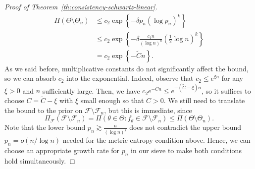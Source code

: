 \begin{proof}[Proof of Theorem~\ref{th:consistency-schwartz-linear}]
\begin{align*}
  \Pi(\Theta \setminus \Theta_n) & \leq c_2 \exp\left\{-\delta p_n (\log p_n)^k\right\}                                                    \\
                                 & \leq c_2 \exp\left\{-\delta \frac{c_1 n}{(\log n)^k}\left(\frac{1}{2}\log n\right)^k\right\} \\
                                 & = c_2 \exp\left\{-\tilde{C}n\right\}.
\end{align*}
As we said before, multiplicative constants do not significantly affect the bound, so we can absorb \(c_2\) into the exponential. Indeed, observe that \(c_2\leq e^{\xi n}\) for any \(\xi>0\) and \(n\) sufficiently large. Then, we have \(c_2e^{-\tilde{C}n} \leq e^{-(\tilde{C}-\xi)n}\), so it suffices to choose \(C=\tilde{C}-\xi\) with \(\xi\) small enough so that \(C>0\). We still need to translate the bound to the prior on \(\mathcal F \setminus \mathcal F_n\), but this is immediate, since
\[
  \Pi_{\mathcal F}(\mathcal F \setminus \mathcal F_n) = \Pi(\theta\in\Theta: f_\theta \in \mathcal F \setminus \mathcal F_n) \leq \Pi(\Theta \setminus \Theta_n).
\]
Note that the lower bound \(p_n \gtrsim \frac{n}{(\log n)^k}\) does not contradict the upper bound \(p_n=o(n/\log n)\) needed for the metric entropy condition above. Hence, we can choose an appropriate growth rate for \(p_n\) in our sieve to make both conditions hold simultaneously.


\end{proof}
